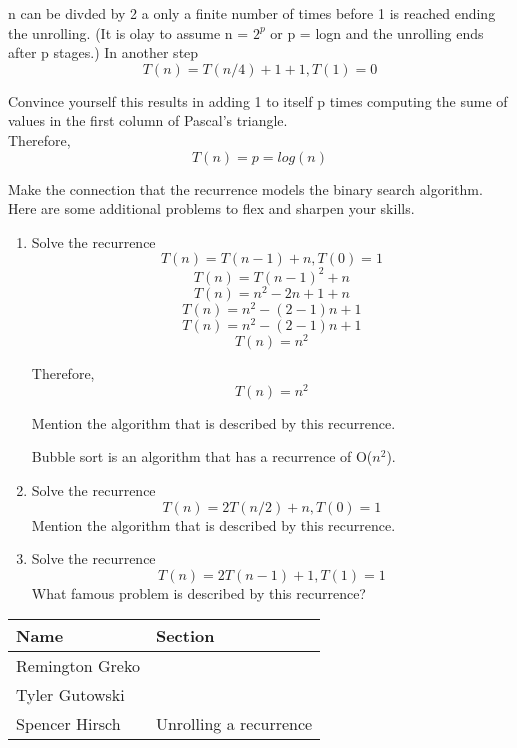 \documentclass{article}
\begin{document}
\noindent n can be divded by 2 a only a finite number of times before 1 is
reached ending the unrolling. (It is olay to assume n = $2^p$ or p = logn and the
unrolling ends after p stages.) In another step
\[ T(n) = T(n/4) + 1 + 1, T(1) = 0 \]

\noindent Convince yourself this results in adding 1 to itself p times computing
the sume of values in the first column of Pascal's triangle.\\
Therefore,
\[ T(n) = p = log(n) \]

\noindent Make the connection that the recurrence models the binary search algorithm.\\
\noindent Here are some additional problems to flex and sharpen your skills.

\begin{enumerate}
    \item Solve the recurrence
            \[ T(n) = T(n-1) + n, T(0) = 1 \]
            \[ T(n) = T(n-1)^2 + n\]
            \[ T(n) = n^2 -2n + 1 + n\]
            \[ T(n) = n^2 - (2-1)n + 1\]
            \[ T(n) = n^2 - (2-1)n + 1\]
            \[T(n) = n^2\]

            Therefore, \[T(n) = n^2\]

            Mention the algorithm that is described by this recurrence.

            Bubble sort is an algorithm that has a recurrence of O($n^2$).
    \item Solve the recurrence
            \[ T(n) = 2T(n/2) + n, T(0) = 1 \]
            Mention the algorithm that is described by this recurrence.
    \item Solve the recurrence
            \[ T(n) = 2T(n-1) + 1, T(1) = 1 \]
            What famous problem is described by this recurrence?
\end{enumerate}


\pagebreak

\begin{center}
        \begin{tabular}{|p{3cm}|p{6cm}|}
            \hline
            \textbf{Name} & \textbf{Section} \\
            \hline
            Remington Greko & \\
            \hline
            Tyler Gutowski & \\
            \hline
            Spencer Hirsch & Unrolling a recurrence \\
            \hline
        \end{tabular}
    \end{center}
\end{document}
